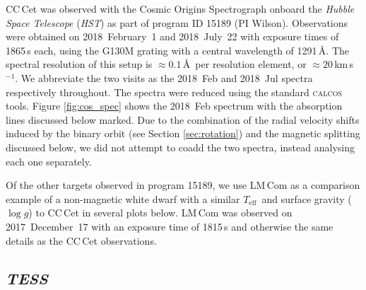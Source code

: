 \documentclass[fleqn,usenatbib]{mnras}
\newcommand{\kms}{km\,s$^{-1}$}
\newcommand{\Teff}{\mbox{$T_{\mathrm{eff}}$}}
\newcommand{\logg}{\mbox{$\log g$}}
\begin{document}
CC\,Cet was observed with the Cosmic Origins Spectrograph \citep[COS,][]{greenetal12-1} onboard the \textit{Hubble Space Telescope} (\textit{HST}) as part of program ID 15189 (PI Wilson). Observations were obtained on 2018~February~1 and 2018~July~22 with exposure times of 1865\,s each, using the G130M grating with a central wavelength of 1291\,\AA. The spectral resolution of this setup is $\approx 0.1$\,\AA\ per resolution element, or $\approx20$\,\kms. We abbreviate the two visits as the 2018~Feb and 2018~Jul spectra respectively throughout. The spectra were reduced using the standard \textsc{calcos} tools. Figure \ref{fig:cos_spec} shows the 2018~Feb spectrum with the absorption lines discussed below marked. Due to the combination of the radial velocity shifts induced by the binary orbit (see Section \ref{sec:rotation}) and the magnetic splitting discussed below, we did not attempt to coadd the two spectra, instead analysing each one separately. 

Of the other targets observed in program 15189, we use LM\,Com as a comparison example of a non-magnetic white dwarf with a similar \Teff\ and surface gravity (\logg) to CC\,Cet in several plots below. LM\,Com was observed on 2017~December~17 with an exposure time of 1815\,s and otherwise the same details as the CC\,Cet observations. 


\subsection{\textit{TESS}}
\end{document}
